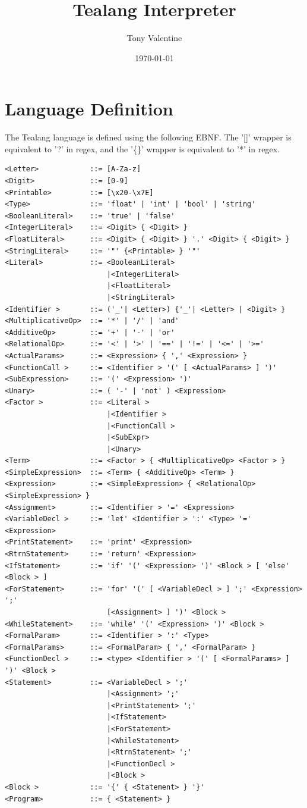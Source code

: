 \documentclass[11pt]{article}
\author{Tony Valentine}
\date{\today}
\title{Tealang Interpreter}
\begin{document}
\maketitle
\tableofcontents

\newpage
\section{Language Definition}
\label{sec:orgcc679d4}

The Tealang language is defined using the following EBNF. The '[]' wrapper is equivalent to '?' in regex, and the '\{\}' wrapper is equivalent to '*' in regex.

\begin{verbatim}
<Letter>            ::= [A-Za-z]
<Digit>             ::= [0-9]
<Printable>         ::= [\x20-\x7E]
<Type>              ::= 'float' | 'int' | 'bool' | 'string'
<BooleanLiteral>    ::= 'true' | 'false'
<IntegerLiteral>    ::= <Digit> { <Digit> }
<FloatLiteral>      ::= <Digit> { <Digit> } '.' <Digit> { <Digit> }
<StringLiteral>     ::= '"' {<Printable> } '"'
<Literal>           ::= <BooleanLiteral>
                        |<IntegerLiteral>
                        |<FloatLiteral>
                        |<StringLiteral>
<Identifier >       ::= ('_'| <Letter>) {'_'| <Letter> | <Digit> }
<MultiplicativeOp>  ::= '*' | '/' | 'and'
<AdditiveOp>        ::= '+' | '-' | 'or'
<RelationalOp>      ::= '<' | '>' | '==' | '!=' | '<=' | '>='
<ActualParams>      ::= <Expression> { ',' <Expression> }
<FunctionCall >     ::= <Identifier > '(' [ <ActualParams> ] ')'
<SubExpression>     ::= '(' <Expression> ')'
<Unary>             ::= ( '-' | 'not' ) <Expression>
<Factor >           ::= <Literal >
                        |<Identifier >
                        |<FunctionCall >
                        |<SubExpr>
                        |<Unary>
<Term>              ::= <Factor > { <MultiplicativeOp> <Factor > }
<SimpleExpression>  ::= <Term> { <AdditiveOp> <Term> }
<Expression>        ::= <SimpleExpression> { <RelationalOp> <SimpleExpression> }
<Assignment>        ::= <Identifier > '=' <Expression>
<VariableDecl >     ::= 'let' <Identifier > ':' <Type> '=' <Expression>
<PrintStatement>    ::= 'print' <Expression>
<RtrnStatement>     ::= 'return' <Expression>
<IfStatement>       ::= 'if' '(' <Expression> ')' <Block > [ 'else' <Block > ]
<ForStatement>      ::= 'for' '(' [ <VariableDecl > ] ';' <Expression> ';'
                        [<Assignment> ] ')' <Block >
<WhileStatement>    ::= 'while' '(' <Expression> ')' <Block >
<FormalParam>       ::= <Identifier > ':' <Type>
<FormalParams>      ::= <FormalParam> { ',' <FormalParam> }
<FunctionDecl >     ::= <type> <Identifier > '(' [ <FormalParams> ] ')' <Block >
<Statement>         ::= <VariableDecl > ';'
                        |<Assignment> ';'
                        |<PrintStatement> ';'
                        |<IfStatement>
                        |<ForStatement>
                        |<WhileStatement>
                        |<RtrnStatement> ';'
                        |<FunctionDecl >
                        |<Block >
<Block >            ::= '{' { <Statement> } '}'
<Program>           ::= { <Statement> }

\end{verbatim}
\end{document}
